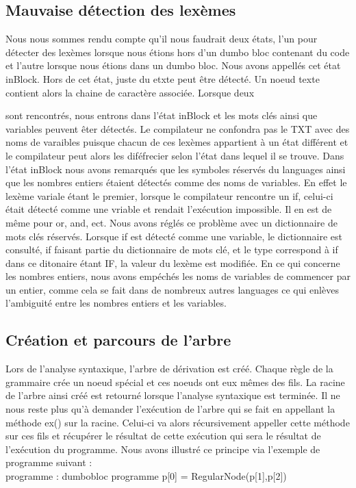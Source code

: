 \documentclass[a4paper,10pt]{article}
\begin{document}
\subsection{Mauvaise détection des lexèmes}
Nous nous sommes rendu compte qu'il nous faudrait deux états, l'un pour détecter des lexèmes lorsque nous étions hors d'un dumbo bloc contenant du code et l'autre
lorsque nous étions dans un dumbo bloc. Nous avons appellés cet état inBlock. Hors de cet état, juste du etxte peut être détecté. Un noeud texte contient alors la chaine
de caractère associée. Lorsque deux {{ sont rencontrés, nous entrons dans l'état inBlock et les mots clés ainsi que variables peuvent êter détectés. Le
compilateur ne confondra pas le TXT avec des noms de varaibles puisque chacun de ces lexèmes appartient à un état différent et le compilateur peut alors les 
diféfrecier selon l'état dans lequel il se trouve. Dans l'état inBlock nous avons remarqués que les symboles réservés du languages ainsi que les nombres entiers 
étaient détectés comme des noms de variables. En effet le lexème variale étant le premier, lorsque le compilateur rencontre un if, celui-ci était détecté comme 
une vriable et rendait l'exécution impossible. Il en est de même pour or, and, ect. Nous avons réglés ce problème avec un dictionnaire de mots clés réservés.
Lorsque if est détecté comme une variable, le dictionnaire est consulté, if faisant partie du dictionnaire de mots clé, et le type correspond à if dans ce ditonaire
étant IF, la valeur du lexème est modifiée. En ce qui concerne les nombres entiers, nous avons empéchés les noms de variables de commencer par un entier, comme cela
se fait dans de nombreux autres languages ce qui enlèves l'ambiguité entre les nombres entiers et les variables.
\subsection{Création et parcours de l'arbre}
Lors de l'analyse syntaxique, l'arbre de dérivation est créé. Chaque règle de la grammaire crée un noeud spécial et ces noeuds ont eux mêmes des fils. La racine 
de l'arbre ainsi créé est retourné lorsque l'analyse syntaxique est terminée. Il ne nous reste plus qu'à demander l'exécution de l'arbre qui se fait en appellant
la méthode \textrm{ex()} sur la racine. Celui-ci va alors récursivement appeller cette méthode sur ces fils et récupérer le résultat de cette exécution qui sera le
résultat de l'exécution du programme. Nous avons illustré ce principe via l'exemple de programme suivant : \\
programme : dumbobloc programme
p[0] = RegularNode(p[1],p[2])

}}
\end{document}
